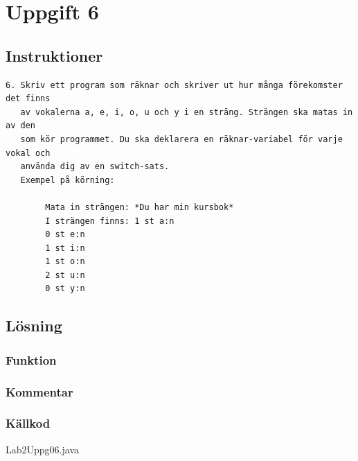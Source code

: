 \section{Uppgift 6}\label{sec:uppg06}

\subsection{Instruktioner}
\begin{verbatim}
6. Skriv ett program som räknar och skriver ut hur många förekomster det finns
   av vokalerna a, e, i, o, u och y i en sträng. Strängen ska matas in av den
   som kör programmet. Du ska deklarera en räknar-variabel för varje vokal och
   använda dig av en switch-sats.
   Exempel på körning:

        Mata in strängen: *Du har min kursbok*
        I strängen finns: 1 st a:n
        0 st e:n
        1 st i:n
        1 st o:n
        2 st u:n
        0 st y:n
\end{verbatim}

\subsection{Lösning}
\subsubsection{Funktion}

\subsubsection{Kommentar}


\subsubsection{Källkod}
\caption{Lab2Uppg06.java}
\label{src:uppg06}


